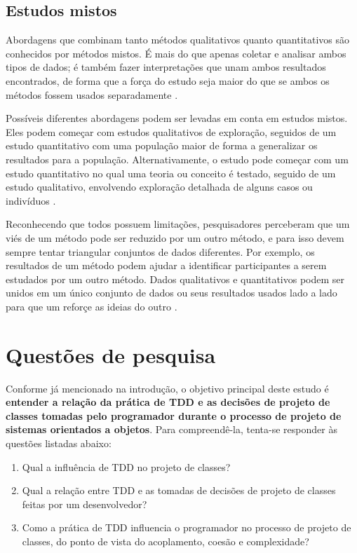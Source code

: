 \subsection{Estudos mistos}

Abordagens que combinam tanto métodos qualitativos quanto quantitativos são conhecidos por métodos mistos. 
É mais do que apenas coletar e analisar ambos tipos de dados; é também fazer interpretações que unam ambos
resultados encontrados, de forma que a força do estudo seja maior do que se ambos os métodos fossem
usados separadamente \cite{creswell}.

Possíveis diferentes abordagens podem ser levadas em conta em estudos mistos. Eles podem começar com estudos
qualitativos de exploração, seguidos de um estudo quantitativo com uma população maior de forma a
generalizar os resultados para a população. Alternativamente, o estudo pode começar com um estudo quantitativo
no qual uma teoria ou conceito é testado, seguido de um estudo qualitativo, envolvendo exploração detalhada
de alguns casos ou indivíduos \cite{creswell}.

Reconhecendo que todos possuem limitações, pesquisadores perceberam que um viés de um método pode ser reduzido
por um outro método, e para isso devem sempre tentar triangular conjuntos de dados diferentes.
Por exemplo, os resultados de um método podem ajudar a identificar participantes a serem estudados por um outro método.
Dados qualitativos e quantitativos podem ser unidos em um único conjunto de dados ou seus resultados usados
lado a lado para que um reforçe as ideias do outro \cite{creswell}.

\section{Questões de pesquisa}

Conforme já mencionado na introdução, 
o objetivo principal deste estudo é \textbf{entender a relação da prática de TDD 
e as decisões de projeto de classes tomadas pelo programador durante o processo de 
projeto de sistemas orientados a objetos}.
Para compreendê-la, tenta-se responder às questões listadas
abaixo:

\begin{enumerate}

	\item Qual a influência de TDD no projeto de classes?

	\item Qual a relação entre TDD e as tomadas de decisões de projeto de classes
	feitas por um desenvolvedor?

	\item Como a prática de TDD influencia o programador no processo de  
	projeto de classes, do ponto de vista do acoplamento, coesão e complexidade?

\end{enumerate}

